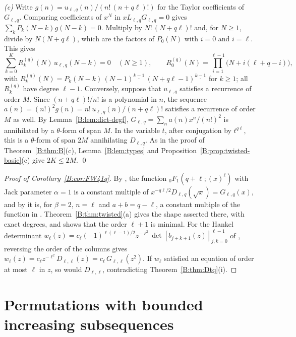\documentclass[11pt,a4paper]{article}
\theoremstyle{definition}
\theoremstyle{remark}
\newcommand{\ff}[2]{#1^{\underline{#2}}}
\numberwithin{equation}{section}
\begin{document}
\emph{(c)} Write $g(n)=u_{\ell,q}(n)/(n!\,(n+q\ell)!)$ for the Taylor coefficients of $G_{\ell,q}$. Comparing coefficients of $x^N$ in $xL_{\ell,q}G_{\ell,q}=0$ gives $\sum_kP_k(N-k)g(N-k)=0$. Multiply by $N!\,(N+q\ell)!$ and, for $N\ge1$, divide by $N(N+q\ell)$, which are the factors of $P_0(N)$ with $i=0$ and $i=\ell$. This gives
\[
\sum_{k=0}^{K}R^{(q)}_k(N)\,u_{\ell,q}(N-k)=0\quad(N\ge1),\qquad R^{(q)}_0(N)=\prod_{i=1}^{\ell-1}\bigl(N+i(\ell+q-i)\bigr),
\]
with $R^{(q)}_k(N)=P_k(N-k)\,\ff{(N-1)}{k-1}\,\ff{(N+q\ell-1)}{k-1}$ for $k\ge1$; all $R^{(q)}_k$ have degree $\ell-1$. Conversely, suppose that $u_{\ell,q}$ satisfies a recurrence of order $M$. Since $(n+q\ell)!/n!$ is a polynomial in $n$, the sequence $a(n)=(n!)^2g(n)=n!\,u_{\ell,q}(n)/(n+q\ell)!$ satisfies a recurrence of order $M$ as well. By Lemma~\ref{B:lem:dict-degf}, $G_{\ell,q}=\sum_na(n)x^n/(n!)^2$ is annihilated by a $\theta$-form of span $M$. In the variable $t$, after conjugation by $t^{q\ell}$, this is a $\theta$-form of span $2M$ annihilating $D_{\ell,q}$. As in the proof of Theorem~\ref{B:thm:B}(c), Lemma~\ref{B:lem:types} and Proposition~\ref{B:prop:twisted-basic}(c) give $2K\le2M$. \qed

\begin{proof}[Proof of Corollary~\ref{B:cor:FW41q}]
By \cite[(2.4), (2.5)]{FW26}, the function ${}_0F_1(q+\ell;(x)^\ell)$ with Jack parameter $\alpha=1$ is a constant multiple of $x^{-q\ell/2}D_{\ell,q}(\sqrt x)=G_{\ell,q}(x)$, and by \cite[(3.10)]{FW26} it is, for $\beta=2$, $n=\ell$ and $a+b=q-\ell$, a constant multiple of the function in \cite[Prop.~4.1]{FW26}. Theorem~\ref{B:thm:twisted}(a) gives the shape asserted there, with exact degrees, and shows that the order $\ell+1$ is minimal. For the Hankel determinant $w_\ell(z)=c_\ell(-1)^{\ell(\ell-1)/2}z^{-\ell^2}\det[b_{j+k+1}(z)]_{j,k=0}^{\ell-1}$ of \cite[App.~B]{FW26}, reversing the order of the columns gives $w_\ell(z)=c_\ell z^{-\ell^2}D_{\ell,\ell}(z)=c_\ell\,G_{\ell,\ell}(z^2)$. If $w_\ell$ satisfied an equation of order at most $\ell$ in $z$, so would $D_{\ell,\ell}$, contradicting Theorem~\ref{B:thm:Dtq}(i).
\end{proof}

\section{Permutations with bounded increasing subsequences}\label{B:sec:perm}
\end{document}
